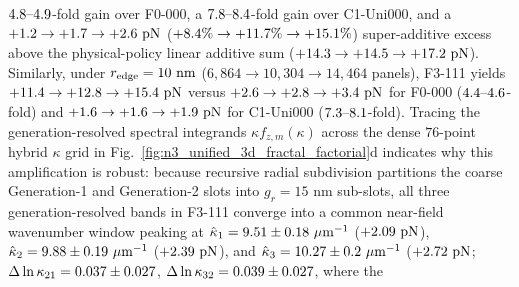 \documentclass[pdflatex,sn-nature]{sn-jnl}
\DeclareRobustCommand{\roundone}[1]{\fpeval{round(#1,1)}}
\DeclareRobustCommand{\roundtwo}[1]{\fpeval{round(#1,2)}}
\DeclareRobustCommand{\roundthree}[1]{\fpeval{round(#1,3)}}
\begin{document}
$\roundone{\NthreeMtRatioFoneoneoneVsFzerozerozeroRfivenmTtwo}\text{--}\roundone{\NthreeMtRatioFoneoneoneVsFzerozerozeroRfivenmTthree}$-fold gain over F0-000, a $\roundone{\NthreeMtRatioFoneoneoneVsUnizerozerozeroRfivenmTone}\text{--}\roundone{\NthreeMtRatioFoneoneoneVsUnizerozerozeroRfivenmTthree}$-fold gain over C1-Uni000, and a $+\roundone{\NthreeMtSuperaddExcessRfivenmTonePn} \to +\roundone{\NthreeMtSuperaddExcessRfivenmTtwoPn} \to +\roundone{\NthreeMtSuperaddExcessRfivenmTthreePn}\text{ pN}$ ($+\roundone{\NthreeMtSuperaddExcessRfivenmTonePct}\% \to +\roundone{\NthreeMtSuperaddExcessRfivenmTtwoPct}\% \to +\roundone{\NthreeMtSuperaddExcessRfivenmTthreePct}\%$) super-additive excess above the physical-policy linear additive sum ($+\roundone{\NthreeMtLinearSumRfivenmTonePn} \to +\roundone{\NthreeMtLinearSumRfivenmTtwoPn} \to +\roundone{\NthreeMtLinearSumRfivenmTthreePn}\text{ pN}$). Similarly, under $r_{\rm edge} = 10\text{ nm}$ ($6{,}864 \to 10{,}304 \to 14{,}464$ panels), F3-111 yields $+\roundone{\NthreeMtFoneoneoneUnifiedRonezeronmToneFzPn} \to +\roundone{\NthreeMtFoneoneoneUnifiedRonezeronmTtwoFzPn} \to +\roundone{\NthreeMtFoneoneoneUnifiedRonezeronmTthreeFzPn}\text{ pN}$ versus $+\roundone{\NthreeMtFzerozerozeroRonezeronmToneFzPn} \to +\roundone{\NthreeMtFzerozerozeroRonezeronmTtwoFzPn} \to +\roundone{\NthreeMtFzerozerozeroRonezeronmTthreeFzPn}\text{ pN}$ for F0-000 ($\roundone{\NthreeMtRatioFoneoneoneVsFzerozerozeroRonezeronmTone}\text{--}\roundone{\NthreeMtRatioFoneoneoneVsFzerozerozeroRonezeronmTtwo}$-fold) and $+\roundone{\NthreeMtCtrlUnizerozerozeroRonezeronmToneFzPn} \to +\roundone{\NthreeMtCtrlUnizerozerozeroRonezeronmTtwoFzPn} \to +\roundone{\NthreeMtCtrlUnizerozerozeroRonezeronmTthreeFzPn}\text{ pN}$ for C1-Uni000 ($\roundone{\NthreeMtRatioFoneoneoneVsUnizerozerozeroRonezeronmTone}\text{--}\roundone{\NthreeMtRatioFoneoneoneVsUnizerozerozeroRonezeronmTthree}$-fold). Tracing the generation-resolved spectral integrands $\kappa f_{z,m}(\kappa)$ across the dense $76$-point hybrid $\kappa$ grid in Fig.~\ref{fig:n3_unified_3d_fractal_factorial}d indicates why this amplification is robust: because recursive radial subdivision partitions the coarse Generation-1 and Generation-2 slots into $g_r = 15\text{ nm}$ sub-slots, all three generation-resolved bands in F3-111 converge into a common near-field wavenumber window peaking at $\hat{\kappa}_1 = \roundtwo{\NthreeUnithreedFoneoneoneGenoneKPeakUmInv} \pm \roundtwo{\NthreeUnithreedFoneoneoneGenoneKPeakSigmaUmInv}\ \mu\text{m}^{-1}$ ($+\roundtwo{\NthreeUnithreedFoneoneoneGenoneKfPeakPn}\text{ pN}$), $\hat{\kappa}_2 = \roundtwo{\NthreeUnithreedFoneoneoneGentwoKPeakUmInv} \pm \roundtwo{\NthreeUnithreedFoneoneoneGentwoKPeakSigmaUmInv}\ \mu\text{m}^{-1}$ ($+\roundtwo{\NthreeUnithreedFoneoneoneGentwoKfPeakPn}\text{ pN}$), and $\hat{\kappa}_3 = \roundtwo{\NthreeUnithreedFoneoneoneGenthreeKPeakUmInv} \pm \roundtwo{\NthreeUnithreedFoneoneoneGenthreeKPeakSigmaUmInv}\ \mu\text{m}^{-1}$ ($+\roundtwo{\NthreeUnithreedFoneoneoneGenthreeKfPeakPn}\text{ pN}$; $\Delta\ln\kappa_{21} = \roundthree{\NthreeUnithreedFoneoneoneDlnkTwoone} \pm \roundthree{\NthreeUnithreedFoneoneoneDlnkTwooneSigma}$, $\Delta\ln\kappa_{32} = \roundthree{\NthreeUnithreedFoneoneoneDlnkThreetwo} \pm \roundthree{\NthreeUnithreedFoneoneoneDlnkThreetwoSigma}$, where the 
\end{document}
